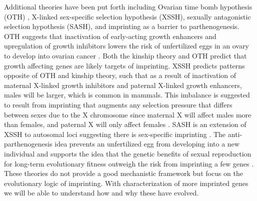 Additional theories have been put forth including Ovarian time bomb hypothesis (OTH) , X-linked sex-specific selection hypothesis (XSSH), sexually antagonistic selection hypothesis (SASH), and imprinting as a barrier to parthenogenesis. OTH suggests that inactivation of early-acting growth enhancers and upregulation of growth inhibitors lowers the risk of unfertilized eggs in an ovary to develop into ovarian cancer \citep{Morison2005,Jirtle:2007jm}. Both the kinship theory and OTH predict that growth affecting genes are likely targets of imprinting. XSSH predicts patterns opposite of OTH and kinship theory, such that as a result of inactivation of maternal X-linked growth inhibitors and paternal X-linked growth enhancers, males will be larger, which is common in mammals. This imbalance is suggested to result from imprinting that augments any selection pressure that differs between sexes due to the X chromosome since maternal X will affect males more than females, and paternal X will only affect females \citep{Morison2005}. SASH is an extension of XSSH to autosomal loci suggesting there is sex-specific imprinting \citep{Morison2005}. The anti-parthenogenesis idea prevents an unfertilized egg from developing into a new individual and supports the idea that the genetic benefits of sexual reproduction for long-term evolutionary fitness outweigh the risk from imprinting a few genes \citep{Jirtle:2007jm,Kono:2006jj}. These theories do not provide a good mechanistic framework but focus on the evolutionary logic of imprinting. With characterization of more imprinted genes we will be able to understand how and why these have evolved. 
 
